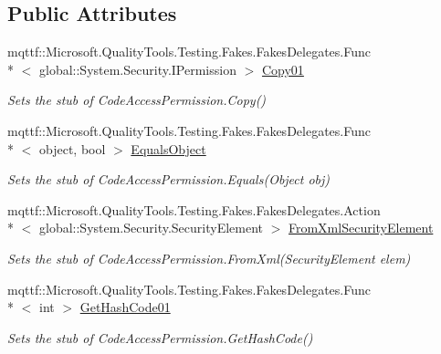 \subsection*{Public Attributes}
\begin{DoxyCompactItemize}
\item 
mqttf\-::\-Microsoft.\-Quality\-Tools.\-Testing.\-Fakes.\-Fakes\-Delegates.\-Func\\*
$<$ global\-::\-System.\-Security.\-I\-Permission $>$ \hyperlink{class_system_1_1_security_1_1_fakes_1_1_stub_code_access_permission_a4d65296f72f8f0349d24adab05642df6}{Copy01}
\begin{DoxyCompactList}\small\item\em Sets the stub of Code\-Access\-Permission.\-Copy()\end{DoxyCompactList}\item 
mqttf\-::\-Microsoft.\-Quality\-Tools.\-Testing.\-Fakes.\-Fakes\-Delegates.\-Func\\*
$<$ object, bool $>$ \hyperlink{class_system_1_1_security_1_1_fakes_1_1_stub_code_access_permission_ac827fdc5fbf4494419b2a39a3419cabe}{Equals\-Object}
\begin{DoxyCompactList}\small\item\em Sets the stub of Code\-Access\-Permission.\-Equals(\-Object obj)\end{DoxyCompactList}\item 
mqttf\-::\-Microsoft.\-Quality\-Tools.\-Testing.\-Fakes.\-Fakes\-Delegates.\-Action\\*
$<$ global\-::\-System.\-Security.\-Security\-Element $>$ \hyperlink{class_system_1_1_security_1_1_fakes_1_1_stub_code_access_permission_a48cf3bfdb95f260bc437edc56224cebc}{From\-Xml\-Security\-Element}
\begin{DoxyCompactList}\small\item\em Sets the stub of Code\-Access\-Permission.\-From\-Xml(\-Security\-Element elem)\end{DoxyCompactList}\item 
mqttf\-::\-Microsoft.\-Quality\-Tools.\-Testing.\-Fakes.\-Fakes\-Delegates.\-Func\\*
$<$ int $>$ \hyperlink{class_system_1_1_security_1_1_fakes_1_1_stub_code_access_permission_a8cd3ef7916ff1e9f2dae0a0a2686016c}{Get\-Hash\-Code01}
\begin{DoxyCompactList}\small\item\em Sets the stub of Code\-Access\-Permission.\-Get\-Hash\-Code()\end{DoxyCompactList}\item 

\end{DoxyCompactItemize}
